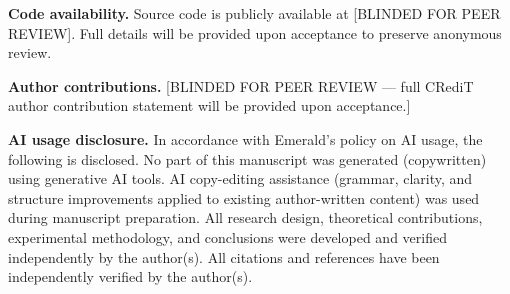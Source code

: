 \documentclass[a4paper,12pt]{article}
\begin{document}
\bigskip\noindent\textbf{Code availability.}
Source code is publicly available at [BLINDED FOR PEER REVIEW]. Full
details will be provided upon acceptance to preserve anonymous review.

\bigskip\noindent\textbf{Author contributions.}
[BLINDED FOR PEER REVIEW --- full CRediT author contribution statement
will be provided upon acceptance.]

\bigskip\noindent\textbf{AI usage disclosure.}
In accordance with Emerald's policy on AI usage, the following is
disclosed. No part of this manuscript was generated (copywritten) using
generative AI tools. AI copy-editing assistance (grammar, clarity, and
structure improvements applied to existing author-written content) was
used during manuscript preparation. All research design, theoretical
contributions, experimental methodology, and conclusions were developed
and verified independently by the author(s). All citations and references
have been independently verified by the author(s).


\end{document}
